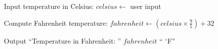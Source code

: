 \begin{algorithm}
\caption{Convert Celsius to Fahrenheit}
\begin{algorithmic}[1]

\STATE Input temperature in Celsius:
\STATE $celsius \gets$ user input

\STATE Compute Fahrenheit temperature:
\STATE $fahrenheit \gets \left(celsius \times \frac{9}{5}\right) + 32$

\STATE Output ``Temperature in Fahrenheit: '' $fahrenheit$ `` $^\circ$F''

\end{algorithmic}
\end{algorithm}